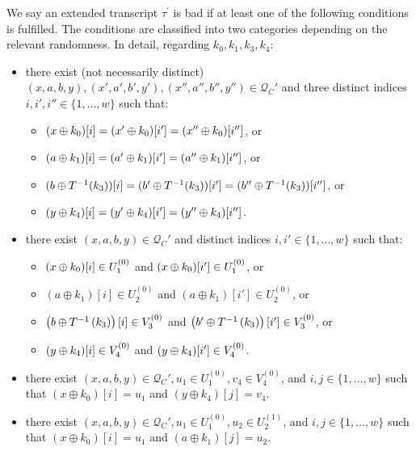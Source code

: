 \begin{definition}
\label{defn:bad-tau-4-rounds}

We say an extended transcript $\tau^{\prime}$ is bad if at least one of the following conditions is fulfilled. The conditions are classified into two categories depending on the relevant randomness. In detail, regarding $k_0,k_1,k_3,k_4$:
\begin{itemize}[leftmargin=10mm]
	\item[\bone] there exist (not necessarily distinct) $(x,a,b,y),(x',a',b',y'),(x'',a'',b'',y'')\in \mathcal{Q}_{C}'$ and three distinct indices $i, i', i'' \in \{1, \ldots, w\}$ such that:
	\begin{itemize}
		\item $(x\oplus k_0)[i]=(x'\oplus k_0)[i']=(x''\oplus k_0)[i'']$, or
		\item $(a\oplus k_1)[i]=(a'\oplus k_1)[i']=(a''\oplus k_1)[i'']$, or
		\item $(b\oplus T^{-1}(k_3))[i]=(b'\oplus T^{-1}(k_3))[i']=(b''\oplus T^{-1}(k_3))[i'']$, or
		\item $(y\oplus k_4)[i]=(y'\oplus k_4)[i']=(y''\oplus k_4)[i'']$.
	\end{itemize}
	\item[\btwo] there exist $(x,a,b,y) \in \mathcal{Q}_{C}'$ and distinct indices $i, i' \in \{1, \ldots, w\}$ such that:
	\begin{itemize}
		\item $(x\oplus k_0)[i]\in U_1^{(0)}$ and $(x\oplus k_0)[i']\in U_1^{(0)}$, or
		\item $(a \oplus k_1)[i]\in U_{2}^{(0)}$ and $(a \oplus k_1)[i']\in U_{2}^{(0)}$, or
		\item $\left(b\oplus T^{-1}\left(k_3\right)\right)[i]\in V_3^{(0)}$ and
		$\left(b'\oplus T^{-1}\left(k_3\right)\right)[i']\in V_3^{(0)}$, or
		\item $(y\oplus k_4)[i]\in V_4^{(0)}$ and $(y\oplus k_4)[i']\in V_4^{(0)}$.
	\end{itemize}
	\item[\bthree] there exist $(x,a,b,y) \in \mathcal{Q}_{C}', u_1 \in U_1^{(0)}, v_4 \in V_4^{(0)}$, and $i, j \in \{1, \ldots, w\}$ such that $\left(x \oplus k_{0}\right)[i]=u_1$ and $\left(y \oplus k_{4}\right)[j]=v_4$.
	\item[\bfour] there exist $(x,a,b,y) \in \mathcal{Q}_{C}', u_1 \in U_1^{(0)}, u_2\in U_2^{(1)}$, and $i, j \in \{1, \ldots, w\}$ such that $\left(x \oplus k_{0}\right)[i]=u_1$ and $\left(a\oplus k_{1}\right)[j]=u_2$.

\end{itemize}
\end{definition}
